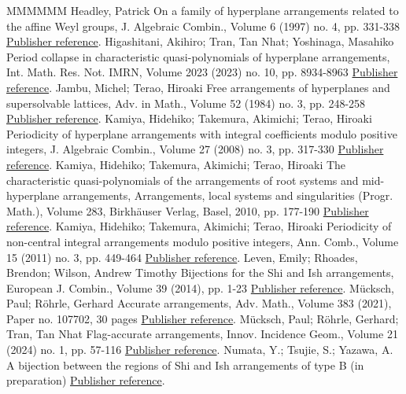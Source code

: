 \documentclass[11pt]{article}
\theoremstyle{definition}
\numberwithin{equation}{section}
\begin{document}
\begin{thebibliography}{MMMMMM}
 Headley, Patrick On a family of hyperplane arrangements related to the affine Weyl groups, J. Algebraic Combin., Volume 6 (1997) no. 4, pp. 331-338 \href{https://alco.centre-mersenne.org/articles/10.5802/alco.405/#Headley97}{Publisher reference}.
 Higashitani, Akihiro; Tran, Tan Nhat; Yoshinaga, Masahiko Period collapse in characteristic quasi-polynomials of hyperplane arrangements, Int. Math. Res. Not. IMRN, Volume 2023 (2023) no. 10, pp. 8934-8963 \href{https://alco.centre-mersenne.org/articles/10.5802/alco.405/#HTY23}{Publisher reference}.
 Jambu, Michel; Terao, Hiroaki Free arrangements of hyperplanes and supersolvable lattices, Adv. in Math., Volume 52 (1984) no. 3, pp. 248-258 \href{https://alco.centre-mersenne.org/articles/10.5802/alco.405/#JT84}{Publisher reference}.
 Kamiya, Hidehiko; Takemura, Akimichi; Terao, Hiroaki Periodicity of hyperplane arrangements with integral coefficients modulo positive integers, J. Algebraic Combin., Volume 27 (2008) no. 3, pp. 317-330 \href{https://alco.centre-mersenne.org/articles/10.5802/alco.405/#KTT08}{Publisher reference}.
 Kamiya, Hidehiko; Takemura, Akimichi; Terao, Hiroaki The characteristic quasi-polynomials of the arrangements of root systems and mid-hyperplane arrangements, Arrangements, local systems and singularities (Progr. Math.), Volume 283, Birkhäuser Verlag, Basel, 2010, pp. 177-190 \href{https://alco.centre-mersenne.org/articles/10.5802/alco.405/#KTT10}{Publisher reference}.
 Kamiya, Hidehiko; Takemura, Akimichi; Terao, Hiroaki Periodicity of non-central integral arrangements modulo positive integers, Ann. Comb., Volume 15 (2011) no. 3, pp. 449-464 \href{https://alco.centre-mersenne.org/articles/10.5802/alco.405/#KTT11}{Publisher reference}.
 Leven, Emily; Rhoades, Brendon; Wilson, Andrew Timothy Bijections for the Shi and Ish arrangements, European J. Combin., Volume 39 (2014), pp. 1-23 \href{https://alco.centre-mersenne.org/articles/10.5802/alco.405/#LRW14}{Publisher reference}.
 Mücksch, Paul; Röhrle, Gerhard Accurate arrangements, Adv. Math., Volume 383 (2021), Paper no. 107702, 30 pages \href{https://alco.centre-mersenne.org/articles/10.5802/alco.405/#MR21}{Publisher reference}.
 Mücksch, Paul; Röhrle, Gerhard; Tran, Tan Nhat Flag-accurate arrangements, Innov. Incidence Geom., Volume 21 (2024) no. 1, pp. 57-116 \href{https://alco.centre-mersenne.org/articles/10.5802/alco.405/#MRT24}{Publisher reference}.
 Numata, Y.; Tsujie, S.; Yazawa, A. A bijection between the regions of Shi and Ish arrangements of type B (in preparation) \href{https://alco.centre-mersenne.org/articles/10.5802/alco.405/#NTY}{Publisher reference}.

\end{thebibliography}
\end{document}
